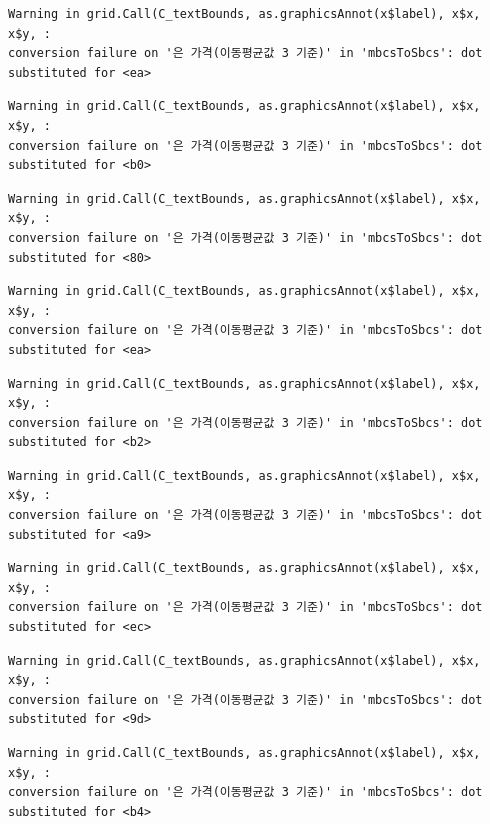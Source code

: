 \documentclass[
  letterpaper,
  DIV=11,
  numbers=noendperiod]{scrreprt}
\begin{document}
\begin{verbatim}
Warning in grid.Call(C_textBounds, as.graphicsAnnot(x$label), x$x, x$y, :
conversion failure on '은 가격(이동평균값 3 기준)' in 'mbcsToSbcs': dot
substituted for <ea>
\end{verbatim}

\begin{verbatim}
Warning in grid.Call(C_textBounds, as.graphicsAnnot(x$label), x$x, x$y, :
conversion failure on '은 가격(이동평균값 3 기준)' in 'mbcsToSbcs': dot
substituted for <b0>
\end{verbatim}

\begin{verbatim}
Warning in grid.Call(C_textBounds, as.graphicsAnnot(x$label), x$x, x$y, :
conversion failure on '은 가격(이동평균값 3 기준)' in 'mbcsToSbcs': dot
substituted for <80>
\end{verbatim}

\begin{verbatim}
Warning in grid.Call(C_textBounds, as.graphicsAnnot(x$label), x$x, x$y, :
conversion failure on '은 가격(이동평균값 3 기준)' in 'mbcsToSbcs': dot
substituted for <ea>
\end{verbatim}

\begin{verbatim}
Warning in grid.Call(C_textBounds, as.graphicsAnnot(x$label), x$x, x$y, :
conversion failure on '은 가격(이동평균값 3 기준)' in 'mbcsToSbcs': dot
substituted for <b2>
\end{verbatim}

\begin{verbatim}
Warning in grid.Call(C_textBounds, as.graphicsAnnot(x$label), x$x, x$y, :
conversion failure on '은 가격(이동평균값 3 기준)' in 'mbcsToSbcs': dot
substituted for <a9>
\end{verbatim}

\begin{verbatim}
Warning in grid.Call(C_textBounds, as.graphicsAnnot(x$label), x$x, x$y, :
conversion failure on '은 가격(이동평균값 3 기준)' in 'mbcsToSbcs': dot
substituted for <ec>
\end{verbatim}

\begin{verbatim}
Warning in grid.Call(C_textBounds, as.graphicsAnnot(x$label), x$x, x$y, :
conversion failure on '은 가격(이동평균값 3 기준)' in 'mbcsToSbcs': dot
substituted for <9d>
\end{verbatim}

\begin{verbatim}
Warning in grid.Call(C_textBounds, as.graphicsAnnot(x$label), x$x, x$y, :
conversion failure on '은 가격(이동평균값 3 기준)' in 'mbcsToSbcs': dot
substituted for <b4>
\end{verbatim}
\end{document}
